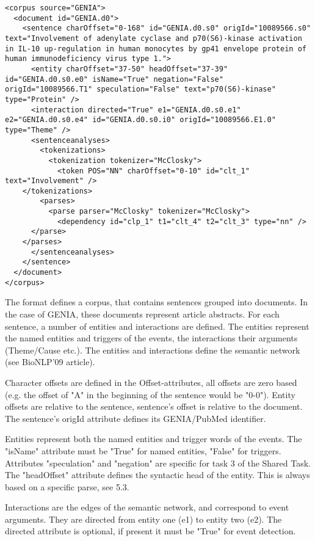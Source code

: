 \documentclass[a4paper,12pt]{article}
\begin{document}
\begin{lstlisting}
<corpus source="GENIA">
  <document id="GENIA.d0">
    <sentence charOffset="0-168" id="GENIA.d0.s0" origId="10089566.s0" text="Involvement of adenylate cyclase and p70(S6)-kinase activation in IL-10 up-regulation in human monocytes by gp41 envelope protein of human immunodeficiency virus type 1.">
      <entity charOffset="37-50" headOffset="37-39" id="GENIA.d0.s0.e0" isName="True" negation="False" origId="10089566.T1" speculation="False" text="p70(S6)-kinase" type="Protein" />
      <interaction directed="True" e1="GENIA.d0.s0.e1" e2="GENIA.d0.s0.e4" id="GENIA.d0.s0.i0" origId="10089566.E1.0" type="Theme" />
      <sentenceanalyses>
        <tokenizations>
          <tokenization tokenizer="McClosky">
            <token POS="NN" charOffset="0-10" id="clt_1" text="Involvement" />
 	</tokenizations>
        <parses>
          <parse parser="McClosky" tokenizer="McClosky">
            <dependency id="clp_1" t1="clt_4" t2="clt_3" type="nn" />
	  </parse>
	</parses>
      </sentenceanalyses>
    </sentence>
  </document>
</corpus>
\end{lstlisting}

The format defines a corpus, that contains sentences grouped into documents. In the case of GENIA, these documents represent article abstracts. For each sentence, a number of entities and interactions are defined. The entities represent the named entities and triggers of the events, the interactions their arguments (Theme/Cause etc.). The entities and interactions define the semantic network (see BioNLP'09 article).

Character offsets are defined in the Offset-attributes, all offsets are zero based (e.g. the offset of "A" in the beginning of the sentence would be "0-0"). Entity offsets are relative to the sentence, sentence's offset is relative to the document. The sentence's origId attribute defines its GENIA/PubMed identifier.

Entities represent both the named entities and trigger words of the events. The "isName" attribute must be "True" for named entities, "False" for triggers. Attributes "speculation" and "negation" are specific for task 3 of the Shared Task. The "headOffset" attribute defines the syntactic head of the entity. This is always based on a specific parse, see 5.3.

Interactions are the edges of the semantic network, and correspond to event arguments. They are directed from entity one (e1) to entity two (e2). The directed attribute is optional, if present it must be "True" for event detection.
\end{document}
